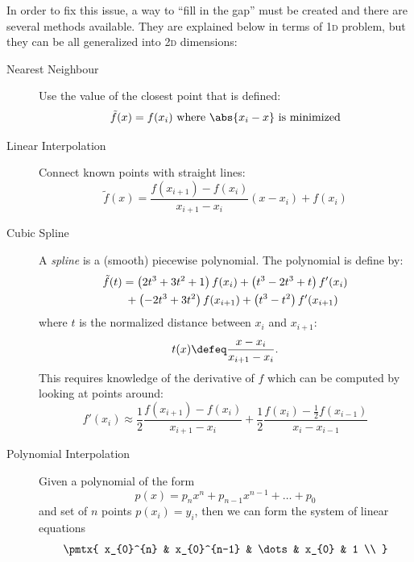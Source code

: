 \documentclass[
  a4paper,             %
  11pt,                %
  oneside,             %
  onecolumn,           %
  bibliography=totoc,  %
  final,               %
]{scrartcl}
\begin{document}
In order to fix this issue, a way to \enquote{fill in the gap} must be created
and there are several methods available.  They are explained below in terms of
\textsc{1d} problem, but they can be all generalized into \textsc{2d}
dimensions:
\begin{description}
\item[Nearest Neighbour] Use the value of the closest point that is defined:
  \begin{equation}
    \tilde f(x) = f(x_{i}) \text{ where } \abs{x_{i} - x} \text{ is minimized}
  \end{equation}
\item[Linear Interpolation] Connect known points with straight lines:
  \begin{equation}
    \tilde f(x) = \frac{f(x_{i+1}) - f(x_{i})}{x_{i+1} - x_{i}} (x - x_{i}) + f(x_{i})
  \end{equation}
\item[Cubic Spline] A \emph{spline} is a (smooth) piecewise polynomial.  The
  polynomial is define by:
  \begin{align}
    \MoveEqLeft \tilde f(t) = \left( 2t^{3} + 3t^{2} + 1 \right) f(x_{i})
    + \left( t^{3} -2t^{3} + t \right) f'(x_{i}) \\
    &+ \left( -2t^{3} + 3t^{2} \right) f(x_{i+1})
    + \left( t^{3} - t^{2} \right) f'(x_{i+1})
  \end{align}
  where \(t\) is the normalized distance between \(x_{i}\) and \(x_{i+1}\):
  \begin{equation}
    t(x) \defeq \frac{x - x_{i}}{x_{i+1} - x_{i}}.
  \end{equation}
  This requires knowledge of the derivative of \(f\) which can be computed by
  looking at points around:
  \begin{equation}
    f'(x_{i}) \approx \frac{1}{2} \frac{f(x_{i+1}) - f(x_{i})}{x_{i+1} - x_{i}}
    + \frac{1}{2} \frac{f(x_{i}) - \frac{1}{2} f(x_{i-1})}{x_{i} - x_{i-1}}
  \end{equation}
\item[Polynomial Interpolation] Given a polynomial of the form
  \begin{equation}
    p(x) = p_{n} x^{n} + p_{n-1} x^{n-1} + \dots + p_{0}
  \end{equation}
  and set of \(n\) points \(p(x_{i}) = y_{i}\), then we can form the system of
  linear equations
  \begin{equation}
    \pmtx{
      x_{0}^{n} & x_{0}^{n-1} & \dots & x_{0} & 1 \\
}
\end{equation}
\end{description}
\end{document}
